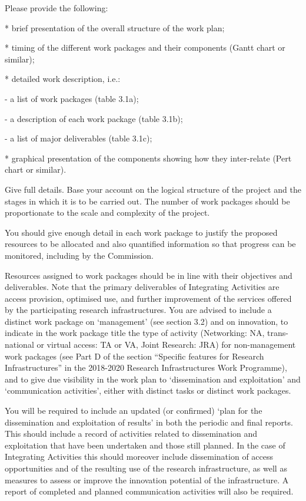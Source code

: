 \begin{todo}{}\color{red}
  Please provide the following:

  * brief presentation of the overall structure of the work plan;
  
  * timing of the different work packages and their components (Gantt chart or similar);

  * detailed work description, i.e.:
  
        - a list of work packages (table 3.1a);

        - a description of each work package (table 3.1b);

        - a list of major deliverables (table 3.1c);

  * graphical presentation of the components showing how they inter-relate (Pert chart or similar).

  Give full details. Base your account on the logical structure of the project and the stages in which it is to be carried out. The number of work packages should be proportionate to the scale and complexity of the project.

  You should give enough detail in each work package to justify the proposed resources to be allocated and also quantified information so that progress can be monitored, including by the Commission.

  Resources assigned to work packages should be in line with their objectives and deliverables. Note that the primary deliverables of Integrating Activities are access provision, optimised use, and further improvement of the services offered by the participating research infrastructures. You are advised to include a distinct work package on ‘management’ (see section 3.2) and on innovation, to indicate in the work package title the type of activity (Networking: NA, trans-national or virtual access: TA or VA, Joint Research: JRA) for non-management work packages (see Part D of the section “Specific features for Research Infrastructures” in the 2018-2020 Research Infrastructures Work Programme), and to give due visibility in the work plan to ‘dissemination and exploitation’ and ‘communication activities’, either with distinct tasks or distinct work packages.

  You will be required to include an updated (or confirmed) ‘plan for the dissemination and exploitation of results’ in both the periodic and final reports. This should include a record of activities related to dissemination and exploitation that have been undertaken and those still planned. In the case of Integrating Activities this should moreover include dissemination of access opportunities and of the resulting use of the research infrastructure, as well as measures to assess or improve the innovation potential of the infrastructure. A report of completed and planned communication activities will also be required.


\end{todo}
